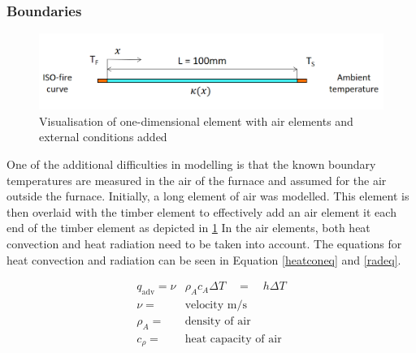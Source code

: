 	\subsubsection{Boundaries} \label{airsec}
	\begin{figure}[H]\label{airelmfig}
	\centering
	\includegraphics[width = 0.75\linewidth]{figures/fem_fire_sketch.png}
	\caption{Visualisation of one-dimensional element with air elements and external conditions added}
	\end{figure}
	
	One of the additional difficulties in modelling is that the known boundary temperatures are measured in the air of the furnace and assumed for the air outside the furnace.
	Initially, a long element of air was modelled.
	This element is then overlaid with the timber element to effectively add an air element it each end of the timber element as depicted in \ref{airelmfig}
	In the air elements, both heat convection and heat radiation need to be taken into account.
	The equations for heat convection and radiation can be seen in Equation \ref{heatconeq} and \ref{radeq}.
	
	\begin{equation} \label{heatconeq}       
	       \begin{aligned}
	       q_{\text{adv}}= \nu &\rho_A c_A \Delta T \quad = \quad h \Delta T\\	      
	       \nu =& \text{velocity m/s}\\
	       \rho_A =& \text{density of air}\\
	       c_{\rho} =& \text{heat capacity of air}\\
          \end{aligned}
	\end{equation}
	       
